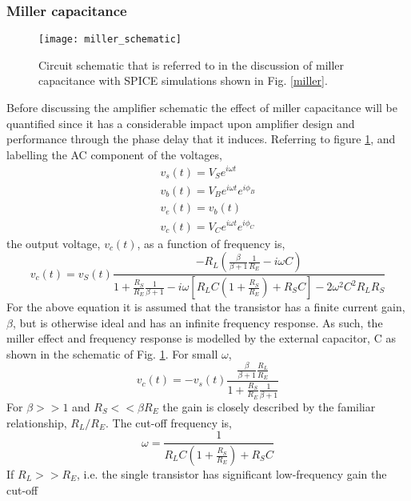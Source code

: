 \documentclass[a4paper,10pt, oneside]{article}
\newcommand{\omm}{\ensuremath{\omega}}
\begin{document}
\subsubsection*{Miller capacitance}
\begin{figure}[H]
\begin{centering}
	\texttt{[image: miller\_schematic]}
	\caption{Circuit schematic that is referred to in the discussion of miller capacitance with SPICE simulations shown in Fig. \ref{miller}.}\label{miller_sch}
\end{centering}	
\end{figure}
Before discussing the amplifier schematic the effect of miller capacitance 
will be quantified since it has a considerable impact upon amplifier design and performance through the phase delay that it induces. 
Referring to figure \ref{miller_sch}, and labelling the AC component of the voltages,
\begin{eqnarray}
v_{s}(t) = V_{S}e^{i\omm t}\\
v_{b}(t) = V_{B}e^{i\omm t}e^{i\phi_{B}}\\
v_{e}(t) = v_{b}(t)\\
v_{c}(t) = V_{C}e^{i\omm t}e^{i\phi_{C}}
\end{eqnarray}
the output voltage, $v_{c}(t)$, as a function of frequency is,
\begin{equation}
v_{c}(t) = v_{S}(t)\frac{-R_{L}\left(\frac{\beta}{\beta+1}\frac{1}{R_{E}}-i\omega C\right)}{1+\frac{R_{S}}{R_{E}}\frac{1}{\beta+1} - i\omega\left[R_{L}C\left(1+\frac{R_{S}}{R_{E}}\right)+R_{S}C\right]-2\omega^{2}C^{2}R_{L}R_{S}}
\end{equation}
For the above equation it is assumed that the transistor has a finite current gain, $\beta$, but is otherwise ideal and has an infinite frequency response. As such, the miller effect and frequency response is modelled 
by the external capacitor, C as shown in the schematic of Fig. \ref{miller_sch}. For small $\omega$,
\begin{equation}
v_{c}(t) = -v_{s}(t)\frac{\frac{\beta}{\beta + 1}\frac{R_{L}}{R_{E}}}{1 + \frac{R_{S}}{R_{E}}\frac{1}{\beta + 1}}
\end{equation}
For $\beta>>1$ and $R_{S}<<\beta R_{E}$ the gain is closely described by the familiar relationship, $R_{L}/R_{E}$.
The cut-off frequency is,
\begin{equation}
\omega = \frac{1}{R_{L}C\left(1+\frac{R_{S}}{R_{E}}\right)+R_{S}C}
\end{equation}
If $R_{L}>>R_{E}$, i.e. the single transistor has significant low-frequency gain the cut-off
\end{document}
